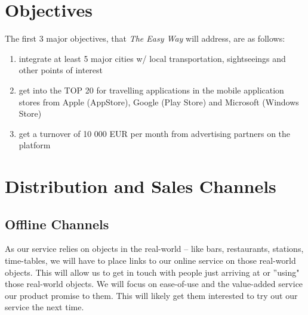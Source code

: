 \documentclass[a4paper]{article}
\begin{document}
\section{Objectives}
\label{sec:objectives}

The first 3 major objectives, that \textit{The Easy Way} will address, are as follows:

\begin{enumerate}
\item integrate at least 5 major cities w/ local transportation, sightseeings and other points of interest
\item  get into the TOP 20 for travelling applications in the mobile application stores from Apple (AppStore), Google (Play Store) and Microsoft (Windows Store)
\item  get a turnover of 10 000 EUR per month from advertising partners on the platform
\end{enumerate}

\section{Distribution and Sales Channels} %
\label{sec:channels}

\subsection{Offline Channels}

As our service relies on objects in the real-world -- like bars, restaurants, stations, time-tables, we will have to place links to our online service on those real-world objects. This will allow us to get in touch with people just arriving at or ''using" those real-world objects. We will focus on ease-of-use and the value-added service our product promise to them. This will likely get them interested to try out our service the next time.
\end{document}
